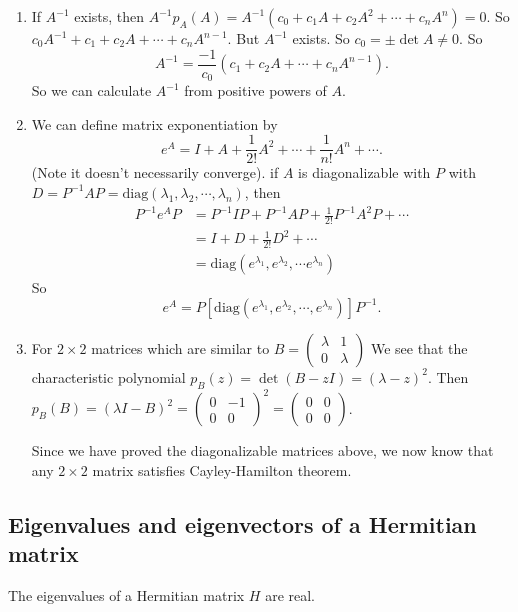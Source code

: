 \documentclass[a4paper]{article}
\begin{document}
\note
\begin{enumerate}
\item If $A^{-1}$ exists, then $A^{-1} p_A(A) = A^{-1}(c_0 + c_1A + c_2A^2 + \cdots + c_n A^n) = 0$. So $c_0 A^{-1} + c_1 + c_2A + \cdots + c_n A^{n - 1}$. But $A^{-1}$ exists. So $c_0 = \pm \det A \not= 0$. So
\[
A^{-1} = \frac{-1}{c_0}(c_1 + c_2 A + \cdots + c_n A^{n -1}).
\]
So we can calculate $A^{-1}$ from positive powers of $A$.
\item We can define matrix exponentiation by
  \[
  e^A = I + A + \frac{1}{2!}A^2 + \cdots + \frac{1}{n!}A^n + \cdots.
  \]
  (Note it doesn't necessarily converge).
  if $A$ is diagonalizable with $P$ with $D = P^{-1}AP = \mathrm{diag}(\lambda_1, \lambda_2, \cdots, \lambda_n)$, then
  \begin{align*}
    P^{-1}e^A P &= P^{-1}IP + P^{-1}AP + \frac{1}{2!}P^{-1}A^2P + \cdots\\
    &= I + D + \frac{1}{2!}D^{2} + \cdots\\
    &= \mathrm{diag}(e^{\lambda_1}, e^{\lambda_2}, \cdots e^{\lambda_n})
  \end{align*}
  So
  \[
  e^A = P[\mathrm{diag}(e^{\lambda_1}, e^{\lambda_2}, \cdots, e^{\lambda_n})]P^{-1}.
  \]
\item For $2\times 2$ matrices which are similar to $B = 
  \begin{pmatrix}
    \lambda & 1\\
    0 & \lambda
  \end{pmatrix}$
  We see that the characteristic polynomial $p_B(z) = \det (B - zI) = (\lambda - z)^2$. Then $p_B(B) = (\lambda I - B)^2 = 
  \begin{pmatrix}
    0 & -1\\
    0 & 0
  \end{pmatrix}^2 = 
  \begin{pmatrix}
    0 & 0\\
    0 & 0
  \end{pmatrix}$.

  Since we have proved the diagonalizable matrices above, we now know that any $2\times 2$ matrix satisfies Cayley-Hamilton theorem. 
\end{enumerate}

\subsection{Eigenvalues and eigenvectors of a Hermitian matrix}
\begin{thm}
  The eigenvalues of a Hermitian matrix $H$ are real.
\end{thm}
\end{document}
